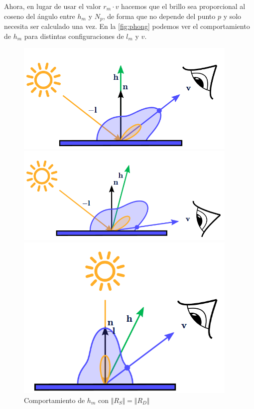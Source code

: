 Ahora, en lugar de usar el valor $r_m\cdot v$ hacemos que el brillo sea proporcional al coseno del ángulo entre $h_m$ y $N_p$, de forma que no depende del punto $p$ y solo necesita ser calculado una vez. En la \autoref{fig:phong} podemos ver el comportamiento de $h_m$ para distintas configuraciones de $l_m$ y $v$.
\begin{figure}[!h]
     \begin{minipage}[c]{0.32\linewidth}
        \centering
        \includegraphics[width=0.95\textwidth, align=b]{Plantilla-TFG-master/img/phong1.png}
     \end{minipage}
     \begin{minipage}[c]{0.32\linewidth}
        \centering
        \includegraphics[width=0.95\textwidth, align=b]{Plantilla-TFG-master/img/phong2.png}
     \end{minipage}
     \begin{minipage}[c]{0.32\linewidth}
        \centering
        \includegraphics[width=0.95\textwidth, align=b]{Plantilla-TFG-master/img/phong3.png}
     \end{minipage}
     \caption{Comportamiento de  $h_m$ con $\Vert R_S\Vert =\Vert R_D\Vert$}
     \label{fig:phong}
\end{figure}

